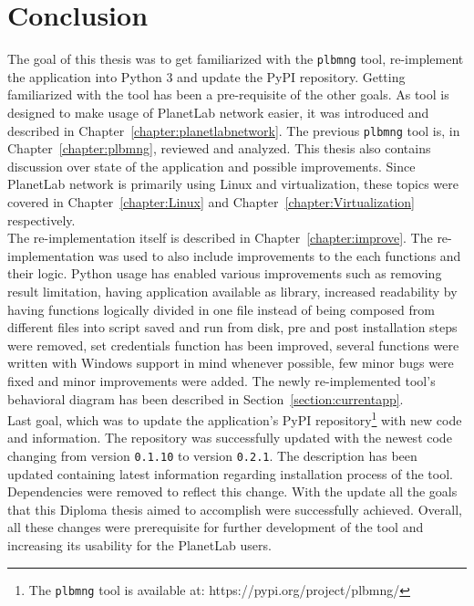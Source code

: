 \chapter{Conclusion}
The goal of this thesis was to get familiarized with the \texttt{plbmng} tool, re-implement the application into Python 3 and update the PyPI repository. Getting familiarized with the tool has been a pre-requisite of the other goals. As tool is designed to make usage of PlanetLab network easier, it was introduced and described in Chapter~\ref{chapter:planetlabnetwork}. The previous \texttt{plbmng} tool is, in Chapter~\ref{chapter:plbmng}, reviewed and analyzed. This thesis also contains discussion over state of the application and possible improvements. Since PlanetLab network is primarily using Linux and virtualization, these topics were covered in Chapter~\ref{chapter:Linux} and Chapter~\ref{chapter:Virtualization} respectively.\\
The re-implementation itself is described in Chapter~\ref{chapter:improve}. The re-implementation was used to also include improvements to the each functions and their logic. Python usage has enabled various improvements such as removing result limitation, having application available as library, increased readability by having functions logically divided in one file instead of being composed from different files into script saved and run from disk, pre and post installation steps were removed, set credentials function has been improved, several functions were written with Windows support in mind whenever possible, few minor bugs were fixed and minor improvements were added. The newly re-implemented tool's behavioral diagram has been described in Section~\ref{section:currentapp}.\\
Last goal, which was to update the application's PyPI repository\footnote{The \texttt{plbmng} tool is available at: https://pypi.org/project/plbmng/} with new code and information. The repository was successfully updated with the newest code changing from version \texttt{0.1.10} to version \texttt{0.2.1}. The description has been updated containing latest information regarding installation process of the tool. Dependencies were removed to reflect this change. With the update all the goals that this Diploma thesis aimed to accomplish were successfully achieved. Overall, all these changes were prerequisite for further development of the tool and increasing its usability for the PlanetLab users.
